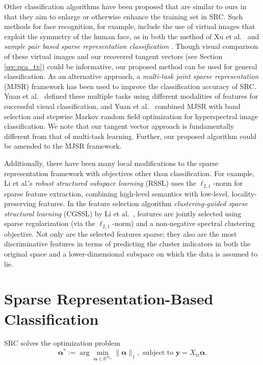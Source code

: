 \documentclass[review]{elsarticle}
\begin{document}
Other classification algorithms have been proposed that are similar to ours in that they aim to enlarge or otherwise enhance the training set in SRC. Such methods for face recognition, for example, include the use of virtual images that exploit the symmetry of the human face, as in both the method of Xu et al.\ \cite{xu:mir} and \emph{sample pair based sparse representation classification} \cite{zha:spsrc}. Though visual comparison of these virtual images and our recovered tangent vectors (see Section \ref{sec:pca_tv}) could be informative, our proposed method can be used for general classification. As an alternative approach, a \emph{multi-task joint sparse representation} (MJSR) framework has been used to improve the classification accuracy of SRC. Yuan et al.\ \cite{yua:mjsr} defined these multiple tasks using different modalities of features for successful visual classification, and Yuan et al.\ \cite{yua:hyper} combined MJSR with band selection and stepwise Markov random field optimization for hyperspectral image classification. We note that our tangent vector approach is fundamentally different from that of multi-task learning. Further, our proposed algorithm could be amended to the MJSR framework.


Additionally, there have been many local modifications to the sparse representation framework with objectives other than classification. For example, Li et al.'s \emph{robust structured subspace learning} (RSSL) \cite{li:rssl} uses the $\ell_{2,1}$-norm for sparse feature extraction, combining high-level semantics with low-level, locality-preserving features. In the feature selection algorithm \emph{clustering-guided sparse structural learning} (CGSSL) by Li et al.\ \cite{li:clust}, features are jointly selected using sparse regularization (via the $\ell_{2,1}$-norm) and a non-negative spectral clustering objective. Not only are the selected features sparse; they also are the most discriminative features in terms of predicting the cluster indicators in both the original space and a lower-dimensional subspace on which the data is assumed to lie. 



\section{Sparse Representation-Based Classification} \label{sec:src}


SRC \cite{wri:src} solves the optimization problem
\begin{equation}\label{eq:src_opt}
\bm{\alpha}^* := \arg \min_{\bm{\alpha}\in \mathbb{R}^{N_\mathrm{tr}}} \|\bm{\alpha}\|_1, \text{ subject to } \bm{y} = X_\mathrm{tr} \bm{\alpha}.
\end{equation}
\end{document}

